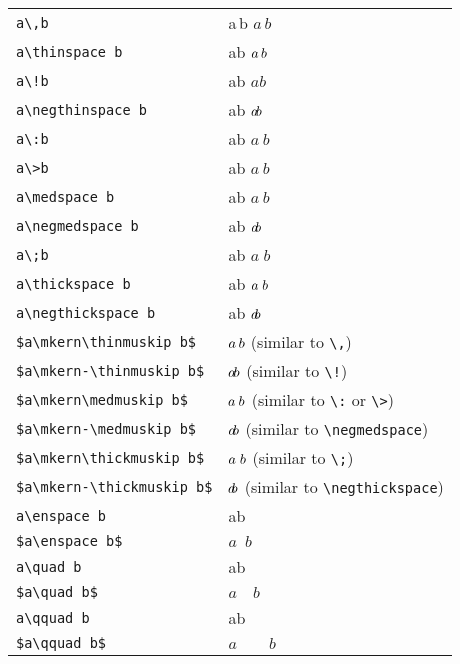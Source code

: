 \begin{tabular}{lp{5cm}}
  \verb|a\,b|                     & a\,b \quad $a\, b$ \\
  \verb|a\thinspace b|            & a\thinspace b \quad $a\thinspace b$ \\
  \verb|a\!b|                     & a\!b \quad $a\!b$ \\
  \verb|a\negthinspace b|         & a\negthinspace b \quad $a\negthinspace b$ \\
  \verb|a\:b|                     & a\:b \quad $a\:b$ \\
  \verb|a\>b|                     & a\>b \quad $a\>b$ \\
  \verb|a\medspace b|             & a\medspace b \quad $a\medspace b$ \\
  \verb|a\negmedspace b|          & a\negmedspace b \quad $a\negmedspace b$ \\
  \verb|a\;b|                     & a\;b \quad $a\;b$ \\
  \verb|a\thickspace b|           & a\thickspace b \quad $a\thickspace b$ \\
  \verb|a\negthickspace b|        & a\negthickspace b \quad $a\negthickspace b$ \\
  \verb|$a\mkern\thinmuskip b$|   & $a\mkern\thinmuskip b$ (similar to \verb|\,|) \\
  \verb|$a\mkern-\thinmuskip b$|  & $a\mkern-\thinmuskip b$ (similar to \verb|\!|) \\
  \verb|$a\mkern\medmuskip b$|    & $a\mkern\medmuskip b$ (similar to \verb|\:| or \verb|\>|) \\
  \verb|$a\mkern-\medmuskip b$|   & $a\mkern-\medmuskip b$ (similar to \verb|\negmedspace|) \\
  \verb|$a\mkern\thickmuskip b$|  & $a\mkern\thickmuskip b$ (similar to \verb|\;|) \\
  \verb|$a\mkern-\thickmuskip b$| & $a\mkern-\thickmuskip b$ (similar to \verb|\negthickspace|) \\
  \verb|a\enspace b|              & a\enspace b \\
  \verb|$a\enspace b$|            & $a\enspace b$ \\
  \verb|a\quad b|                 & a\quad b \\
  \verb|$a\quad b$|               & $a\quad b$ \\
  \verb|a\qquad b|                & a\qquad b \\
  \verb|$a\qquad b$|              & $a\qquad b$ \\

\end{tabular}
